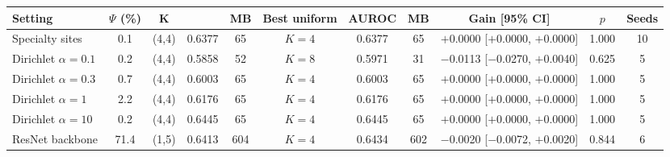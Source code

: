 \begin{tabular}{@{}lcccccccccc@{}}
\toprule
Setting & $\Psi$ (\%) & $\mathbf K$ & \tierfed{} & MB & Best uniform & AUROC & MB & Gain [95\% CI] & $p$ & Seeds\\
\midrule
Specialty sites & 0.1 & (4,4) & 0.6377 & 65 & $K=4$ & 0.6377 & 65 & \ensuremath{+}0.0000 [\ensuremath{+}0.0000, \ensuremath{+}0.0000] & 1.000 & 10\\
Dirichlet $\alpha=0.1$ & 0.2 & (4,4) & 0.5858 & 52 & $K=8$ & 0.5971 & 31 & \ensuremath{-}0.0113 [\ensuremath{-}0.0270, \ensuremath{+}0.0040] & 0.625 & 5\\
Dirichlet $\alpha=0.3$ & 0.7 & (4,4) & 0.6003 & 65 & $K=4$ & 0.6003 & 65 & \ensuremath{+}0.0000 [\ensuremath{+}0.0000, \ensuremath{+}0.0000] & 1.000 & 5\\
Dirichlet $\alpha=1$ & 2.2 & (4,4) & 0.6176 & 65 & $K=4$ & 0.6176 & 65 & \ensuremath{+}0.0000 [\ensuremath{+}0.0000, \ensuremath{+}0.0000] & 1.000 & 5\\
Dirichlet $\alpha=10$ & 0.2 & (4,4) & 0.6445 & 65 & $K=4$ & 0.6445 & 65 & \ensuremath{+}0.0000 [\ensuremath{+}0.0000, \ensuremath{+}0.0000] & 1.000 & 5\\
ResNet backbone & 71.4 & (1,5) & 0.6413 & 604 & $K=4$ & 0.6434 & 602 & \ensuremath{-}0.0020 [\ensuremath{-}0.0072, \ensuremath{+}0.0020] & 0.844 & 6\\
\bottomrule
\end{tabular}
